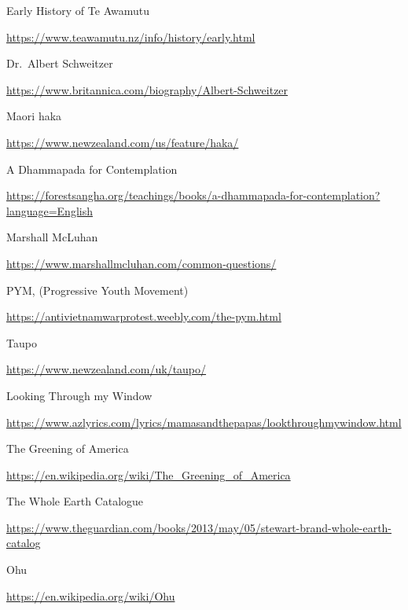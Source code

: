 
\renewcommand*{\prebibhook}{%
  Readers of the print version of In Any Given Moment are invited to visit the
  `teachings' section of \href{https://forestsangha.org}{www.forestsangha.org}
  where they can download an electronic version of this book making the links
  below more readily accessible.}

\begin{thebibliography}{9}

 Early History of Te Awamutu

  {\urlsize \url{https://www.teawamutu.nz/info/history/early.html}}

 Dr.~Albert Schweitzer

  {\urlsize \url{https://www.britannica.com/biography/Albert-Schweitzer}}

 Maori haka

  {\urlsize \url{https://www.newzealand.com/us/feature/haka/}}

 A Dhammapada for Contemplation

  {\urlsize \url{https://forestsangha.org/teachings/books/a-dhammapada-for-contemplation?language=English}}

 Marshall McLuhan

  {\urlsize \url{https://www.marshallmcluhan.com/common-questions/}}

 PYM, (Progressive Youth Movement)

  {\urlsize \url{https://antivietnamwarprotest.weebly.com/the-pym.html}}

 Taupo

  {\urlsize \url{https://www.newzealand.com/uk/taupo/}}

 Looking Through my Window

  {\urlsize \url{https://www.azlyrics.com/lyrics/mamasandthepapas/lookthroughmywindow.html}}

 The Greening of America

  {\urlsize \url{https://en.wikipedia.org/wiki/The_Greening_of_America}}
 
 The Whole Earth Catalogue

  {\urlsize \url{https://www.theguardian.com/books/2013/may/05/stewart-brand-whole-earth-catalog}}

 Ohu

  {\urlsize \url{https://en.wikipedia.org/wiki/Ohu}}


\end{thebibliography}
